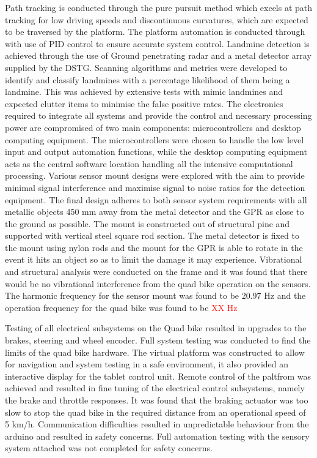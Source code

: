 \documentclass[main.tex]{subfiles}
\begin{document}
Path tracking is conducted through the pure pursuit method which excels at path tracking for low driving speeds and discontinuous curvatures, which are expected to be traversed by the platform.
The platform automation is conducted through with use of PID control to ensure accurate system control. Landmine detection is achieved through the use of Ground penetrating radar and a metal detector array supplied by the DSTG. Scanning algorithms and metrics were developed to identify and classify landmines with a percentage likelihood of them being a landmine. This was achieved by extensive tests with mimic landmines and expected clutter items to minimise the false positive rates. 
The electronics required to integrate all systems and provide the control and necessary processing power are compromised of two main components: microcontrollers and desktop computing equipment. 
The microcontrollers were chosen to handle the low level input and output automation functions, while the desktop computing equipment acts as the central software location handling all the intensive computational processing. 
Various sensor mount designs were explored with the aim to provide minimal signal interference and maximise signal to noise ratios for the detection equipment. 
The final design adheres to both sensor system requirements with all metallic objects 450 mm away from the metal detector and the GPR as close to the ground as possible. 
The mount is constructed out of structural pine and supported with vertical steel square rod section. The metal detector is fixed to the mount using nylon rods and the mount for the GPR is able to rotate in the event it hits an object so as to limit the damage it may experience. Vibrational and structural analysis were conducted on the frame and it was found that there would be no vibrational interference from the quad bike operation on the sensors. The harmonic frequency for the sensor mount was found to be 20.97 Hz and the operation frequency for the quad bike was found to be \textcolor{red}{XX Hz} 

Testing of all electrical subsystems on the Quad bike resulted in upgrades to the brakes, steering and wheel encoder. Full system testing was conducted to find the limits of the quad bike hardware. The virtual platform was constructed to allow for navigation and system testing in a safe environment, it also provided an interactive display for the tablet control unit. Remote control of the paltfrom was achieved and resulted in fine tuning of the electrical control subsystems, namely the brake and throttle responses. It was found that the braking actuator was too slow to stop the quad bike in the required distance from an operational speed of 5 km/h. Communication difficulties resulted in unpredictable behaviour from the arduino and resulted in safety concerns. Full automation testing with the sensory system attached was not completed for safety concerns. 
\end{document}
